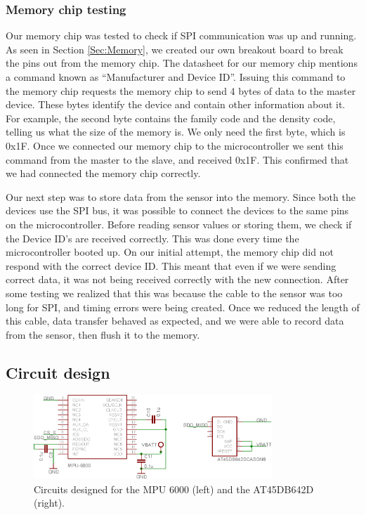 \subsubsection{Memory chip testing}
\label{Sec:MemoryTesting}
Our memory chip was tested to check if SPI communication was up and running.
As seen in Section \ref{Sec:Memory},
we created our own breakout board to break the pins out from the memory chip.
The datasheet for our memory chip mentions a command known as ``Manufacturer and Device ID''.
Issuing this command to the memory chip requests the memory chip to send 4 bytes of data to the master device.
These bytes identify the device and contain other information about it. 
For example, the second byte contains the family code and the density code,
telling us what the size of the memory is.
We only need the first byte, which is 0x1F.
Once we connected our memory chip to the microcontroller we sent this command from the master to the slave,
and received 0x1F.
This confirmed that we had connected the memory chip correctly.

Our next step was to store data from the sensor into the memory.
Since both the devices use the SPI bus,
it was possible to connect the devices to the same pins on the microcontroller.
Before reading sensor values or storing them,
we check if the Device ID's are received correctly.
This was done every time the microcontroller booted up.
On our initial attempt, the memory chip did not respond with the correct device ID.
This meant that even if we were sending correct data,
it was not being received correctly with the new connection.
After some testing we realized that this was because the cable to the sensor was too long for SPI,
and timing errors were being created.
Once we reduced the length of this cable,
data transfer behaved as expected,
and we were able to record data from the sensor,
then flush it to the memory.

\subsection{Circuit design}
\label{Sec:CircuitDesign}

\begin{figure}
\begin{center}
\includegraphics[width=0.8\textwidth]{images/MPU6000Circuit.eps}
\caption{Circuits designed for the MPU 6000 (left) and the AT45DB642D (right).}
\label{Fig:MPUCkt}
\end{center}
\end{figure}

